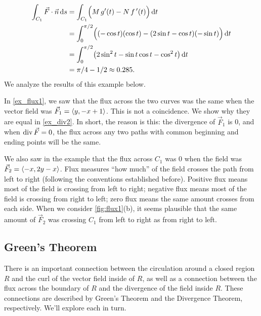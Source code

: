 \begin{example}
\begin{align*}
	\int_{C_1} \vec F\cdot \vec n\operatorname{d}\! s
	& = \int_{C_1} \Bigl(M\,g'(t) - N\,f\,'(t)\Bigr)\operatorname{d}\! t\\
	&= \int_0^{\pi/2}\Bigl((-\cos t)(\cos t) - (2\sin t-\cos t)(-\sin t)\Bigr)\operatorname{d}\! t\\
	&= \int_0^{\pi/2} \bigl(2\sin^2 t-\sin t\cos t-\cos^2t\bigr)\operatorname{d}\! t\\
	&=\pi/4 - 1/2\approx 0.285.
\end{align*}
We analyze the results of this example below.
\end{example}

In \autoref{ex_flux1}, we saw that the flux across the two curves was the same when the vector field was $\vec F_1 =\left\langle y, -x+1\right\rangle$. This is not a coincidence. We show why they are equal in \autoref{ex_div2}. In short, the reason is this: the divergence of $\vec F_1$ is 0, and when $\operatorname{div} \vec F = 0$, the flux across any two paths with common beginning and ending points will be the same.

We also saw in the example that the flux across $C_1$ was 0 when the field was $\vec F_2 =\left\langle -x, 2y-x\right\rangle$. Flux measures ``how much'' of the field crosses the path from left to right (following the conventions established before). Positive flux means most of the field is crossing from left to right; negative flux means most of the field is crossing from right to left; zero flux means the same amount crosses from each side. When we consider \autoref{fig:flux1}(b), it seems plausible that the same amount of $\vec F_2$ was crossing $C_1$ from left to right as from right to left.

%

\subsection{Green's Theorem}

There is an important connection between the circulation around a closed region $R$ and the curl of the vector field inside of $R$, as well as a connection between the flux across the boundary of $R$ and the divergence of the field inside $R$. These connections are described by Green's Theorem and the Divergence Theorem, respectively. We'll explore each in turn.

